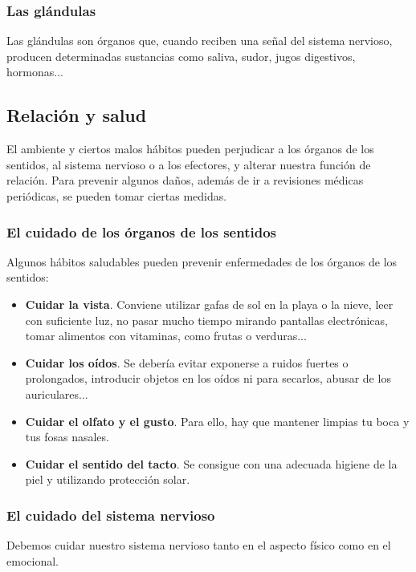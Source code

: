 \subsubsection{Las glándulas}

Las glándulas son órganos que, cuando reciben una señal del sistema nervioso, producen determinadas sustancias como saliva, sudor, jugos digestivos, hormonas...

\subsection{Relación y salud}

El ambiente y ciertos malos hábitos pueden perjudicar a los órganos de los sentidos, al sistema nervioso o a los efectores, y alterar nuestra función de relación. Para prevenir algunos daños, además de ir a revisiones médicas periódicas, se pueden tomar ciertas medidas.

\subsubsection{El cuidado de los órganos de los sentidos}

Algunos hábitos saludables pueden prevenir enfermedades de los órganos de los sentidos:

\begin{itemize}
    \item \textbf{Cuidar la vista}. Conviene utilizar gafas de sol en la playa o la nieve, leer con suficiente luz, no pasar mucho tiempo mirando pantallas electrónicas, tomar alimentos con vitaminas, como frutas o verduras...
    \item \textbf{Cuidar los oídos}. Se debería evitar exponerse a ruidos fuertes o prolongados, introducir objetos en los oídos ni para secarlos, abusar de los auriculares...
    \item \textbf{Cuidar el olfato y el gusto}. Para ello, hay que mantener limpias tu boca y tus fosas nasales.
    \item \textbf{Cuidar el sentido del tacto}. Se consigue con una adecuada higiene de la piel y utilizando protección solar.
\end{itemize}

\subsubsection{El cuidado del sistema nervioso}

Debemos cuidar nuestro sistema nervioso tanto en el aspecto físico como en el emocional.

